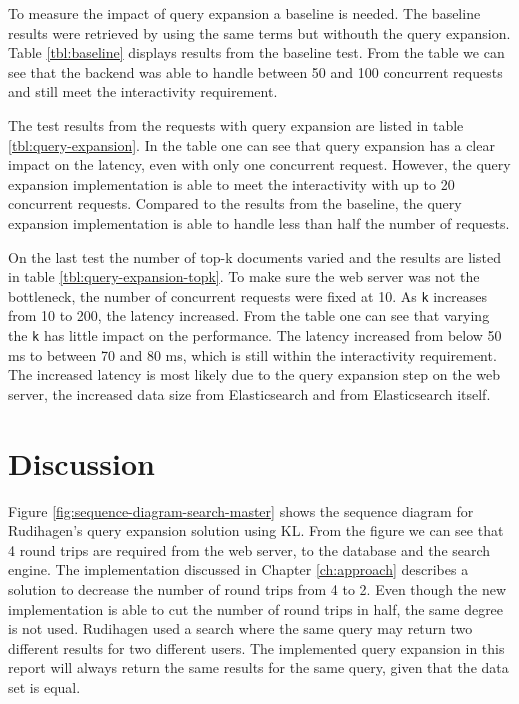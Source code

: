 To measure the impact of query expansion a baseline is needed.
The baseline results were retrieved by using the same terms but withouth the query expansion.
Table \ref{tbl:baseline} displays results from the baseline test.
From the table we can see that the backend was able to handle between 50 and 100 concurrent requests and still meet the interactivity requirement.

The test results from the requests with query expansion are listed in table \ref{tbl:query-expansion}.
In the table one can see that query expansion has a clear impact on the latency, even with only one concurrent request.
However, the query expansion implementation is able to meet the interactivity with up to 20 concurrent requests.
Compared to the results from the baseline,
the query expansion implementation is able to handle less than half the number of requests.

On the last test the number of top-k documents varied and the results are listed in table \ref{tbl:query-expansion-topk}.
To make sure the web server was not the bottleneck, the number of concurrent requests were fixed at 10.
As \texttt{k} increases from 10 to 200, the latency increased.
From the table one can see that varying the \texttt{k} has little impact on the performance.
The latency increased from below 50 ms to between 70 and 80 ms, which is still within the interactivity requirement.
The increased latency is most likely due to the query expansion step on the web server,
the increased data size from Elasticsearch and from Elasticsearch itself.



\section{Discussion}
Figure \ref{fig:sequence-diagram-search-master} shows the sequence diagram for Rudihagen's query expansion solution using KL.
From the figure we can see that 4 round trips are required from the web server, to the database and the search engine.
The implementation discussed in Chapter \ref{ch:approach} describes a solution to decrease the number of round trips from 4 to 2.
Even though the new implementation is able to cut the number of round trips in half, the same degree is not used.
Rudihagen used a search where the same query may return two different results for two different users.
The implemented query expansion in this report will always return the same results for the same query, given that the data set is equal.

